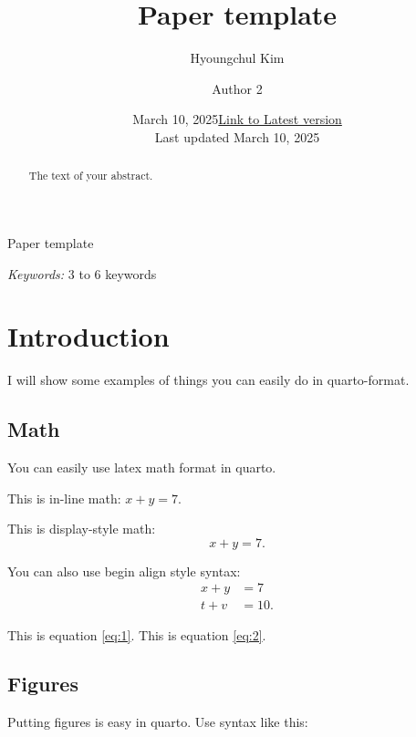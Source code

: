 \documentclass[
  11pt]{article}
\title{Paper template}
\author{Hyoungchul Kim \and Author 2}
\date{March 10, 2025}
\begin{document}
\def\spacingset#1{\renewcommand{\baselinestretch}%
{#1}\small\normalsize} \spacingset{1}



\date{\href{https://hchulkim.github.io}{Link to Latest version}\\ \vspace{1em} Last updated March
10, 2025}
\spacingset{.8}
\bigskip
\bigskip
\bigskip
\begin{center}
  {\LARGE Paper template}
\end{center}
\smallskip
\bigskip
\spacingset{1}

\bigskip
\bigskip
\begin{abstract}
The text of your abstract.
\end{abstract}

\bigskip
\noindent%
{\it Keywords:} 3 to 6 keywords
\vfill

\newpage
\spacingset{1.2} %

\section{Introduction}\label{sec-intro}

I will show some examples of things you can easily do in quarto-format.

\subsection{Math}\label{math}

You can easily use latex math format in quarto.

This is in-line math: \(x + y = 7\).

This is display-style math: \[x + y = 7.\]

You can also use begin align style syntax: \begin{align}
  x + y &= 7\label{eq:1}\\
  t + v &= 10.\label{eq:2}
\end{align}

This is equation \ref{eq:1}. This is equation \ref{eq:2}.

\subsection{Figures}\label{figures}

Putting figures is easy in quarto. Use syntax like this:
\end{document}
